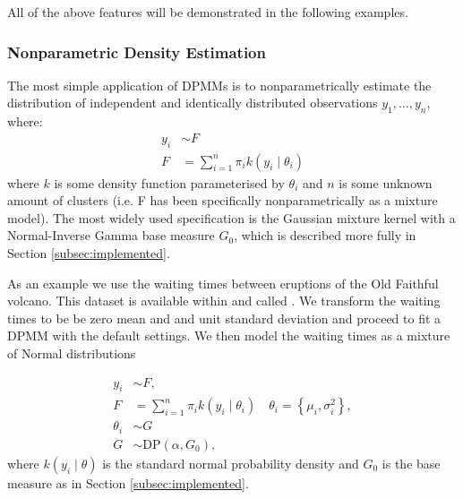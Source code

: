 \documentclass[nojss]{jss}
\begin{document}
All of the above features will be demonstrated in the following examples.

\subsubsection{Nonparametric Density Estimation}
The most simple application of DPMMs is to  nonparametrically estimate the distribution of independent and identically distributed observations $y_1,\ldots,y_n$, where:
\begin{align*}
y_i & \sim F \\
F & = \sum _{i=1} ^n \pi _i k(y_i \mid \theta _i)
\end{align*}
where $k$ is some density function parameterised by $\theta _i$ and $n$ is some unknown amount of clusters (i.e. F has been specifically nonparametrically as a mixture model). The most widely used specification is the Gaussian mixture kernel with a Normal-Inverse Gamma base measure $G_0$, which is described more fully in Section \ref{subsec:implemented}.

As an example we use the waiting times between eruptions of the Old Faithful volcano. This dataset is available within  and called . We transform the waiting times to be be zero mean and and unit standard deviation and proceed to fit a DPMM with the default settings. We then model the waiting times as a mixture of Normal distributions

\begin{align*}
y_i & \sim F, \\
F & = \sum _{i=1} ^n \pi _i k(y_i \mid \theta _i) \quad \theta _i = \left\lbrace \mu _i , \sigma ^2 _i \right\rbrace , \\
\theta _i & \sim G \\
G & \sim \text{DP}(\alpha , G_0),
\end{align*}
where $k(y _i \mid \theta )$ is the standard normal probability density and $G_0$ is the base measure as in Section \ref{subsec:implemented}.

\begin{Schunk}
\end{Schunk}
\end{document}
